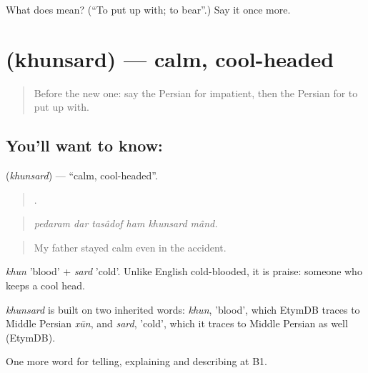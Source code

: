 \begin{tcolorbox}[breakable,colback=teal!4,colframe=teal!35!black,title={Before you move on}]
What does   mean? (\textquotedblleft{}To put up with; to bear\textquotedblright{}.) Say it once more.
\end{tcolorbox}
\section[\texorpdfstring{\fa{خونسرد} (khunsard)}{خونسرد (khunsard)}]{ (khunsard) — calm, cool-headed}

\label{lesson:FA-C481-khunsard}



\begin{quote}
Before the new one: say the Persian for impatient, then the Persian for to put up with.
\end{quote}

\subsection*{You'll want to know: }
\textbf{} (\emph{khunsard}) — \textquotedblleft{}calm, cool-headed\textquotedblright{}.

\begin{quote}
     .
\end{quote}

\begin{quote}
\emph{pedaram dar tasâdof ham khunsard mând.}
\end{quote}

\begin{quote}
My father stayed calm even in the accident.
\end{quote}

\emph{khun} 'blood' + \emph{sard} 'cold'. Unlike English cold-blooded, it is praise: someone who keeps a cool head.

\begin{cousinweb}
\emph{khunsard} is built on two inherited words: \emph{khun}, 'blood', which EtymDB traces to Middle Persian \emph{xūn}, and \emph{sard}, 'cold', which it traces to Middle Persian as well (EtymDB).
\end{cousinweb}

\begin{grammarlens}[title={What you've built}]
One more word for telling, explaining and describing at B1.
\end{grammarlens}

